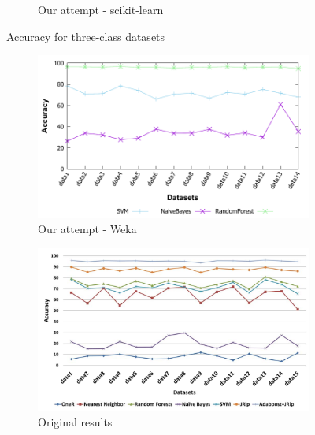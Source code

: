 \begin{figure}[H]
\begin{subfigure}[t]{0.4\textwidth}
        \caption{Our attempt - scikit-learn}
    \end{subfigure}
    \caption{Accuracy for three-class datasets}
    \label{fig:weka_acc3}
\end{figure}

\begin{figure}[H]
    \centering
    \begin{subfigure}[t]{0.4\textwidth}
        \includegraphics[width=\linewidth]{images/weka_accuracy2}
        \caption{Our attempt - Weka}
    \end{subfigure}%
    \begin{subfigure}[t]{0.4\textwidth}
        \includegraphics[width=\linewidth]{images/weka_accuracy2_cite.png}
        \caption{Original results \cite{borges_hink_machine_2014-1}}
    \end{subfigure}    
    \begin{subfigure}[t]{0.4\textwidth}

\end{subfigure}
\end{figure}
